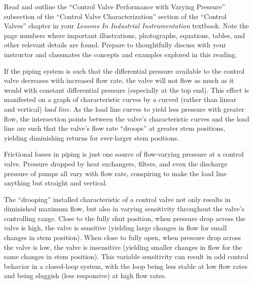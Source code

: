 

Read and outline the ``Control Valve Performance with Varying Pressure'' subsection of the ``Control Valve Characterization'' section of the ``Control Valves'' chapter in your {\it Lessons In Industrial Instrumentation} textbook.  Note the page numbers where important illustrations, photographs, equations, tables, and other relevant details are found.  Prepare to thoughtfully discuss with your instructor and classmates the concepts and examples explored in this reading.














If the piping system is such that the differential pressure available to the control valve decreases with increased flow rate, the valve will not flow as much as it would with constant differential pressure (especially at the top end).  This effect is manifested on a graph of characteristic curves by a curved (rather than linear and vertical) {\it load line}.  As the load line curves to yield less pressure with greater flow, the intersection points between the valve's characteristic curves and the load line are such that the valve's flow rate ``droops'' at greater stem positions, yielding diminishing returns for ever-larger stem positions.

\vskip 10pt

Frictional losses in piping is just one source of flow-varying pressure at a control valve.  Pressure dropped by heat exchangers, filters, and even the discharge pressure of pumps all vary with flow rate, conspiring to make the load line anything but straight and vertical.

\vskip 10pt

The ``drooping'' installed characteristic of a control valve not only results in diminished maximum flow, but also in varying sensitivity throughout the valve's controlling range.  Close to the fully shut position, when pressure drop across the valve is high, the valve is sensitive (yielding large changes in flow for small changes in stem position).  When close to fully open, when pressure drop across the valve is low, the valve is insensitive (yielding smaller changes in flow for the same changes in stem position).  This variable sensitivity can result in odd control behavior in a closed-loop system, with the loop being less stable at low flow rates and being sluggish (less responsive) at high flow rates.






